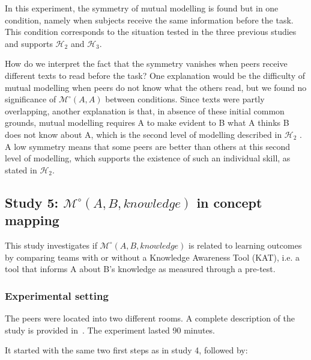 \documentclass[natbib]{svjour3}
\newcommand{\ie}{i.e.\xspace}
\newcommand{\A}{A\xspace}
\newcommand{\B}{B\xspace}
\newcommand{\Model}[3]{{$\mathcal{M}^{\circ}(#1, #2, #3)$}}
\newcommand{\gModel}[2]{{$\mathcal{M}^{\circ}(#1, #2)$}}
\begin{document}
In this experiment, the symmetry of mutual modelling is  found but  in one
condition, namely when subjects receive the same information before the task.
This condition corresponds to the situation tested in the three previous studies
and supports  $\mathcal{H}_{2}$ and  $\mathcal{H}_{3}$. 

How do we interpret the fact that the symmetry vanishes when peers receive
different texts to read before the task? One explanation would be the difficulty
of mutual modelling when peers do not know what the others read, but we found no
significance of \gModel{A}{A} between conditions. Since texts were partly
overlapping, another explanation is that, in absence of these initial common
grounds, mutual modelling requires \A to make evident to \B what \A thinks \B does
not know about A, which is the second level of modelling described in
$\mathcal{H}_{2}$ . A low symmetry means that some peers are better than others
at this second level of modelling, which supports the existence of such an
individual skill, as stated in  $\mathcal{H}_{2}$.

\subsection{{\bf Study 5}: \Model{A}{B}{knowledge} in concept mapping}

This study investigates if \Model{A}{B}{knowledge} is related to learning
outcomes by comparing teams with or without a Knowledge Awareness Tool (KAT),
\ie a tool that informs \A about \B's knowledge as measured through a pre-test.

\subsubsection*{Experimental setting}

The peers were located into two different rooms. A complete description of the
study is provided in~\citet{sangin2008learners}. The experiment lasted 90 minutes.

It started with the same two first steps as in study 4, followed by:
\end{document}
